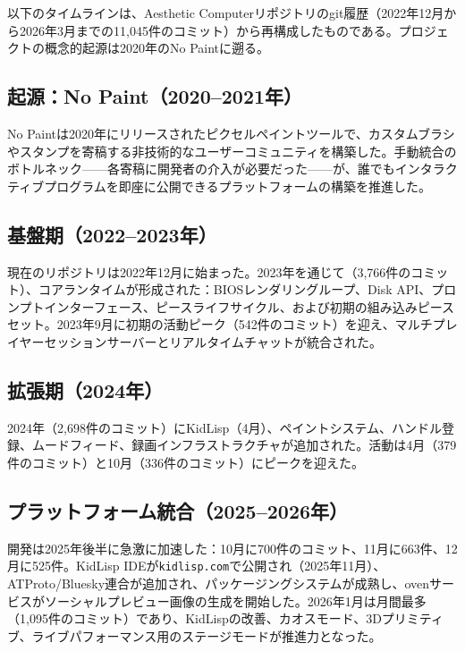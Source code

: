 \documentclass[10pt,letterpaper,twocolumn]{article}
\begin{document}
以下のタイムラインは、Aesthetic Computerリポジトリのgit履歴（2022年12月から2026年3月までの11,045件のコミット）から再構成したものである。プロジェクトの概念的起源は2020年のNo Paintに遡る。

\subsection{起源：No Paint（2020--2021年）}

No Paintは2020年にリリースされたピクセルペイントツールで、カスタムブラシやスタンプを寄稿する非技術的なユーザーコミュニティを構築した。手動統合のボトルネック——各寄稿に開発者の介入が必要だった——が、誰でもインタラクティブプログラムを即座に公開できるプラットフォームの構築を推進した。

\subsection{基盤期（2022--2023年）}

現在のリポジトリは2022年12月に始まった。2023年を通じて（3,766件のコミット）、コアランタイムが形成された：BIOSレンダリングループ、Disk API、プロンプトインターフェース、ピースライフサイクル、および初期の組み込みピースセット。2023年9月に初期の活動ピーク（542件のコミット）を迎え、マルチプレイヤーセッションサーバーとリアルタイムチャットが統合された。

\subsection{拡張期（2024年）}

2024年（2,698件のコミット）にKidLisp（4月）、ペイントシステム、ハンドル登録、ムードフィード、録画インフラストラクチャが追加された。活動は4月（379件のコミット）と10月（336件のコミット）にピークを迎えた。

\subsection{プラットフォーム統合（2025--2026年）}

開発は2025年後半に急激に加速した：10月に700件のコミット、11月に663件、12月に525件。KidLisp IDEが\texttt{kidlisp.com}で公開され（2025年11月）、ATProto/Bluesky連合が追加され、パッケージングシステムが成熟し、ovenサービスがソーシャルプレビュー画像の生成を開始した。2026年1月は月間最多（1,095件のコミット）であり、KidLispの改善、カオスモード、3Dプリミティブ、ライブパフォーマンス用のステージモードが推進力となった。
\end{document}
